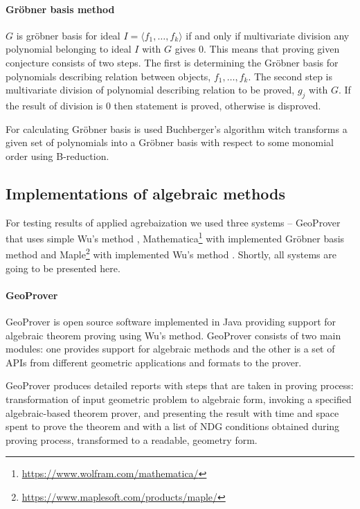 \documentclass[final,1p,times,authoryear]{elsarticle}
\begin{document}
\paragraph{Gr\"obner basis method}

$G$ is gr\"obner basis for ideal $I = \langle f_1, \ldots, f_k
\rangle$ if and only if multivariate division any polynomial belonging
to ideal $I$ with $G$ gives $0$. This means that proving given
conjecture consists of two steps. The first is determining the
Gr\"obner basis for polynomials describing relation between objects,
$f_1, \ldots, f_k$. The second step is multivariate division of
polynomial describing relation to be proved, $g_j$ with $G$. If the
result of division is $0$ then statement is proved, otherwise is
disproved.

For calculating Gr\"obner basis is used Buchberger's algorithm witch
transforms a given set of polynomials into a Gr\"obner basis with
respect to some monomial order using B-reduction.

\subsection{Implementations of algebraic methods}

For testing results of applied agrebaization we used three systems --
GeoProver that uses simple Wu's method \cite{geoprover},
Mathematica\footnote{\url{https://www.wolfram.com/mathematica/}} with
implemented Gr\"obner basis method and
Maple\footnote{\url{https://www.maplesoft.com/products/maple/}} with
implemented Wu's method \cite{wsolve}. Shortly, all systems are going
to be presented here.

\paragraph{GeoProver}

GeoProver is open source software implemented in Java providing
support for algebraic theorem proving using Wu's method. GeoProver
consists of two main modules: one provides support for algebraic
methods and the other is a set of APIs from different geometric
applications and formats to the prover.  

GeoProver produces detailed reports with steps that are taken in
proving process: transformation of input geometric problem to
algebraic form, invoking a specified algebraic-based theorem prover,
and presenting the result with time and space spent to prove the
theorem and with a list of NDG conditions obtained during proving
process, transformed to a readable, geometry form.
\end{document}
